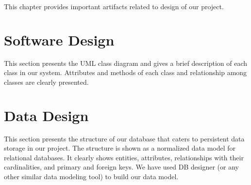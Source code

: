 This chapter provides important artifacts related to design of our project.

\section{Software Design}

This section presents the UML class diagram and gives a brief description of each class in our system. Attributes and methods of each class and relationship among classes are clearly presented.


\section{Data Design}

This section presents the structure of our database that caters to persistent data storage in our project. The structure is shown as a normalized data model for relational databases. It clearly shows entities, attributes, relationships with their cardinalities, and primary and foreign keys. We have used DB designer (or any other similar data modeling tool) to build our data model.